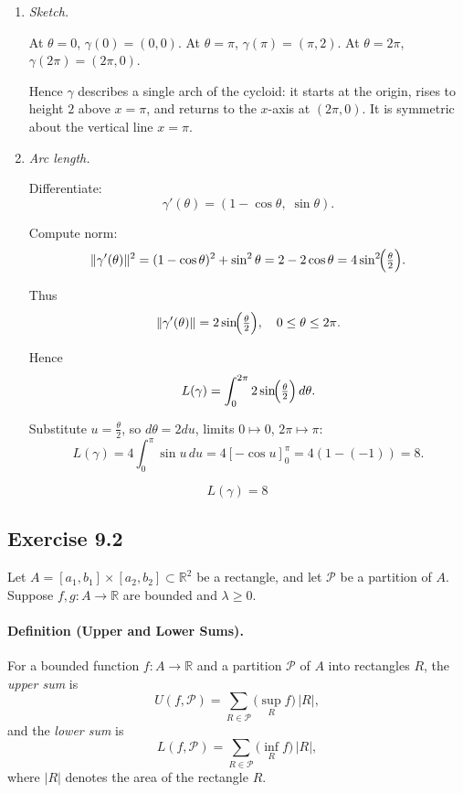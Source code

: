 \documentclass[11pt,a4paper]{article}
\begin{document}
\begin{enumerate}[label=\alph*)]
	
	\item \emph{Sketch.}  
	
	At $\theta=0$, $\gamma(0)=(0,0)$.  
	At $\theta=\pi$, $\gamma(\pi)=(\pi,2)$.  
	At $\theta=2\pi$, $\gamma(2\pi)=(2\pi,0)$.  
	
	Hence $\gamma$ describes a single arch of the cycloid: it starts at the origin, rises to height $2$ above $x=\pi$, and returns to the $x$-axis at $(2\pi,0)$.  
	It is symmetric about the vertical line $x=\pi$.  
	
	\item \emph{Arc length.}  
	
	Differentiate:
	\[
	\gamma'(\theta)=(1-\cos\theta,\;\sin\theta).
	\]
	
	Compute norm:
	\[
	\|\gamma'(\theta)\|^2=(1-\cos\theta)^2+\sin^2\theta
	=2-2\cos\theta
	=4\sin^2\!\Bigl(\tfrac{\theta}{2}\Bigr).
	\]
	
	Thus
	\[
	\|\gamma'(\theta)\|=2\sin\!\Bigl(\tfrac{\theta}{2}\Bigr), \quad 0\le\theta\le 2\pi.
	\]
	
	Hence
	\[
	L(\gamma)=\int_0^{2\pi}2\sin\!\Bigl(\tfrac{\theta}{2}\Bigr)\,d\theta.
	\]
	
	Substitute $u=\tfrac{\theta}{2}$, so $d\theta=2du$, limits $0\mapsto 0$, $2\pi\mapsto \pi$:
	\[
	L(\gamma)=4\int_0^\pi \sin u\,du
	=4[-\cos u]_0^\pi
	=4(1-(-1))=8.
	\]
	
\end{enumerate}

\[
\boxed{L(\gamma)=8}
\]

\subsection*{Exercise 9.2}

Let $A=[a_1,b_1]\times[a_2,b_2]\subset\mathbb{R}^2$ be a rectangle, and let $\mathcal{P}$ be a partition of $A$. 
Suppose $f,g:A\to\mathbb{R}$ are bounded and $\lambda\geq 0$.

\paragraph{Definition (Upper and Lower Sums).}
For a bounded function $f:A\to\mathbb{R}$ and a partition $\mathcal{P}$ of $A$ into rectangles $R$, the \emph{upper sum} is
\[
U(f,\mathcal{P})=\sum_{R\in \mathcal{P}} \big(\sup_{R} f\big)\,|R|,
\]
and the \emph{lower sum} is
\[
L(f,\mathcal{P})=\sum_{R\in \mathcal{P}} \big(\inf_{R} f\big)\,|R|,
\]
where $|R|$ denotes the area of the rectangle $R$.
\end{document}

